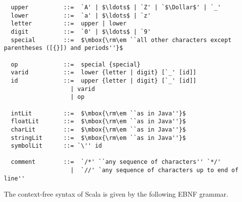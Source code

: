 \documentclass[a4paper,12pt,twoside,titlepage]{book}
\begin{document}
\begin{lstlisting}
  upper          ::=  `A' | $\ldots$ | `Z' | `$\Dollar$' | `_'
  lower          ::=  `a' | $\ldots$ | `z'
  letter         ::=  upper | lower
  digit          ::=  `0' | $\ldots$ | `9'
  special        ::=  $\mbox{\rm\em ``all other characters except parentheses ([{}]) and periods''}$

  op             ::=  special {special} 
  varid          ::=  lower {letter | digit} [`_' [id]]
  id             ::=  upper {letter | digit} [`_' [id]]
                   | varid
                   | op

  intLit         ::=  $\mbox{\rm\em ``as in Java''}$
  floatLit       ::=  $\mbox{\rm\em ``as in Java''}$
  charLit        ::=  $\mbox{\rm\em ``as in Java''}$
  stringLit      ::=  $\mbox{\rm\em ``as in Java''}$
  symbolLit      ::= `\'' id

  comment        ::=  `/*' ``any sequence of characters'' `*/'
                   |  `//' `any sequence of characters up to end of line''
\end{lstlisting}

The context-free syntax of Scala is given by the following EBNF
grammar.
\end{document}
